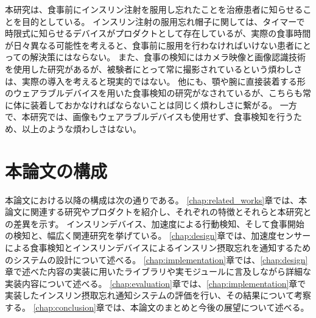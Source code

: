 本研究は、食事前にインスリン注射を服用し忘れたことを治療患者に知らせることを目的としている。
インスリン注射の服用忘れ帽子に関しては、タイマーで時限式に知らせるデバイスがプロダクトとして存在しているが、実際の食事時間が日々異なる可能性を考えると、食事前に服用を行わなければいけない患者にとっての解決策にはならない。
また、食事の検知にはカメラ映像と画像認識技術を使用した研究があるが、被験者にとって常に撮影されているという煩わしさは、実際の導入を考えると現実的ではない。
他にも、顎や腕に直接装着する形のウェアラブルデバイスを用いた食事検知の研究がなされているが、こちらも常に体に装着しておかなければならないことは同じく煩わしさに繋がる。
一方で、本研究では、画像もウェアラブルデバイスも使用せず、食事検知を行うため、以上のような煩わしさはない。

\section{本論文の構成}
\label{section:structure}
本論文における以降の構成は次の通りである。
\ref{chap:related_works}章では、本論文に関連する研究やプロダクトを紹介し、それぞれの特徴とそれらと本研究との差異を示す。
インスリンデバイス、加速度による行動検知、そして食事開始の検知と、幅広く関連研究を挙げている。
\ref{chap:design}章では、加速度センサーによる食事検知とインスリンデバイスによるインスリン摂取忘れを通知するためのシステムの設計について述べる。
\ref{chap:implementation}章では、\ref{chap:design}章で述べた内容の実装に用いたライブラリや実モジュールに言及しながら詳細な実装内容について述べる。
\ref{chap:evaluation}章では、\ref{chap:implementation}章で実装したインスリン摂取忘れ通知システムの評価を行い、その結果について考察する。
\ref{chap:conclusion}章では、本論文のまとめと今後の展望について述べる。
